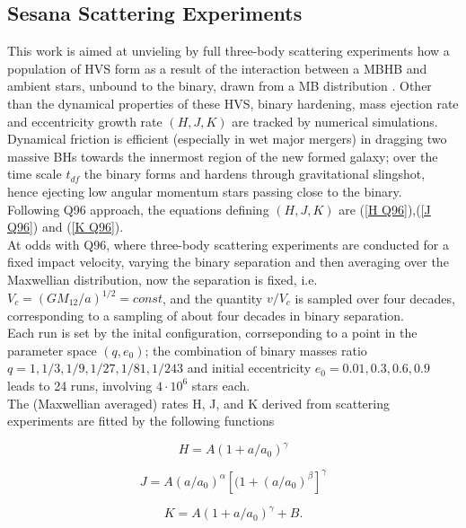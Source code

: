 \subsection{Sesana Scattering Experiments}
This work \cite{Sesana_2006} is aimed at unvieling by  full three-body scattering experiments how a population of HVS form as a result of the interaction between a MBHB and ambient stars, unbound to the binary, drawn from a MB distribution . Other than the dynamical properties of these HVS, binary hardening, mass ejection rate and eccentricity growth rate $(H,J,K)$ are tracked by numerical simulations.\\Dynamical friction is efficient (especially in wet major mergers) in dragging two  massive BHs towards the innermost region of the new formed galaxy; over the time scale $t_{df}$ the binary forms and hardens  through gravitational slingshot, hence ejecting low angular momentum stars passing close to the binary. \\Following Q96 approach, the equations defining $(H,J,K)$ are (\ref{H Q96}),(\ref{J Q96}) and (\ref{K Q96}).\\At odds with Q96, where three-body scattering experiments are conducted for a fixed impact velocity, varying the binary separation and then averaging over the Maxwellian distribution, now the separation is fixed, i.e. $V_c=(GM_{12}/a)^{1/2}=const$, and the quantity $v/V_c$ is sampled over four decades, corresponding to a sampling of about four decades in binary separation.\\Each run is set by the inital configuration, corrseponding to a point in the parameter space $(q,e_0)$; the combination of binary masses ratio $q=1,1/3,1/9,1/27,1/81,1/243$ and initial eccentricity $e_0=0.01,0.3,0.6,0.9$ leads to 24 runs, involving $4\cdot10^6$ stars each.\\The (Maxwellian averaged) rates H, J,
and K derived from scattering experiments are fitted by the following functions


 \begin{equation}
     H=A(1+a/a_0)^\gamma
\end{equation}

 \begin{equation}
    J=A(a/a_0)^\alpha [(1+(a/a_0)^\beta]^\gamma
\end{equation}

\begin{equation}
    K=A(1+a/a_0)^\gamma+B.
\end{equation}

